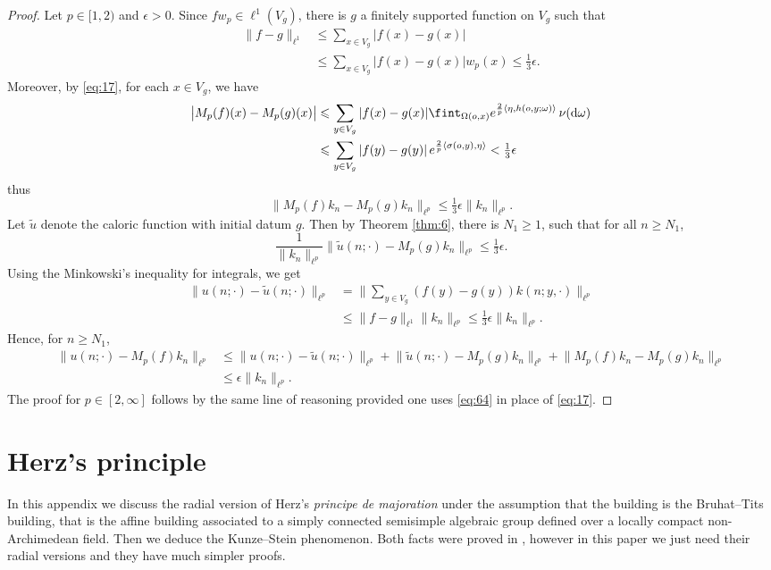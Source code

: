 \documentclass[11pt]{amsart}
\newcommand{\sprod}[2]{\langle {#1}, {#2} \rangle}
\theoremstyle{plain}
\newcounter{thm}
\theoremstyle{definition}
\numberwithin{equation}{section}
\begin{document}
\begin{proof}
	Let $p \in [1, 2)$ and $\epsilon > 0$. Since $f w_p \in \ell^1(V_g)$, there is $g$ a finitely supported function on
	$V_g$ such that
	\begin{align*}
		\|f - g\|_{\ell^1} 
		&\leqslant \sum_{x \in V_g} |f(x) - g(x)| \\
		&\leqslant \sum_{x \in V_g} |f(x) - g(x)| w_p(x) 
		\leqslant \tfrac{1}{3} \epsilon. 
	\end{align*}
	Moreover, by \eqref{eq:17}, for each $x \in V_g$,  we have
	\begin{align*}
		\big| M_p(f)(x) - M_p(g)(x)\big| 
		&\leqslant
		\sum_{y \in V_g} |f(x) - g(x)| 
		\fint_{\Omega(o, x)} e^{\frac{2}{p}\sprod{\eta}{h(o,y;\omega)}}\, \nu({\rm d}\omega) \\
		&\leqslant  \sum_{y\in V_g} |f(y)-g(y)|\, e^{\frac{2}{p}\sprod{\sigma(o,y)}{\eta}}
		< \tfrac{1}{3}\epsilon
	\end{align*}
	thus
	\[
		\big\|M_p(f) k_n - M_p(g) k_n \big\|_{\ell^p}
		\leqslant
		\tfrac{1}{3}\epsilon \|k_n\|_{\ell^p}.
	\]
	Let $\tilde{u}$ denote the caloric function with initial datum $g$. Then by Theorem \ref{thm:6}, there is $N_1 \geqslant 1$,
	such that for all $n \geqslant N_1$,
	\[
		\frac{1}{\|k_n\|_{\ell^p}}
		\big\|\tilde{u}(n; \cdot)-M_p(g) k_n\big\|_{\ell^p}
		\leqslant \tfrac{1}{3} \epsilon.
	\]
	Using the Minkowski's inequality for integrals, we get
	\begin{align*}
		\big\|u(n; \cdot) - \tilde{u}(n; \cdot) \big\|_{\ell^p}
		&=
		\bigg\|\sum_{y \in V_g} (f(y)-g(y)) k(n; y, \cdot) \bigg\|_{\ell^p} \\
		&\leqslant
		\|f -g\|_{\ell^1} \|k_n\|_{\ell^p} 
		\leqslant \tfrac{1}{3} \epsilon  \|k_n\|_{\ell^p}.
	\end{align*}
	Hence, for $n \geqslant N_1$,
	\begin{align*}
		\big\|u(n;\cdot)-M_p(f) k_n\|_{\ell^p}
		&\leqslant
		\big\|u(n; \cdot) - \tilde{u}(n; \cdot) \big\|_{\ell^p}
		+
		\big\|\tilde{u}(n; \cdot)-M_p(g) k_n \big\|_{\ell^p}
		+
		\big\|M_p(f)  k_n - M_p(g) k_n \big\|_{\ell^p}
		\\
		&\leqslant \epsilon \|k_n\|_{\ell^p}.
	\end{align*}
	The proof for $p \in [2, \infty]$ follows by the same line of reasoning provided one uses \eqref{eq:64} in place of 
	\eqref{eq:17}.
\end{proof}
	
\appendix

\section{Herz's principle}
\label{sec:8}
In this appendix we discuss the radial version of Herz's \emph{principe de majoration} under the assumption that the building
is the Bruhat--Tits building, that is the affine building associated to a simply connected semisimple algebraic group defined
over a locally compact non-Archimedean field. Then we deduce the Kunze--Stein phenomenon. Both facts were proved in \cite{veca}, 
however in this paper we just need their radial versions and they have much simpler proofs.
\end{document}
